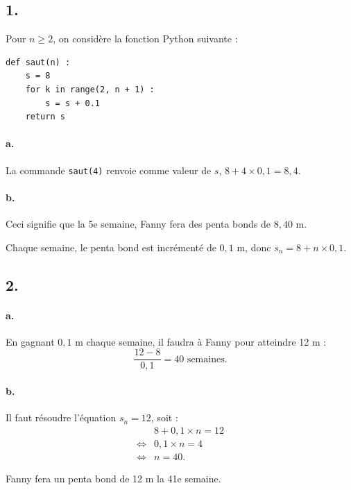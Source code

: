 \subsection*{1.}

Pour \(n \geqslant 2\), on considère la fonction Python suivante :

\begin{center}
\begin{lstlisting}[style=python]
def saut(n) :
    s = 8
    for k in range(2, n + 1) :
        s = s + 0.1
    return s
\end{lstlisting}
\end{center}

\paragraph{a.} La commande \texttt{saut(4)} renvoie comme valeur de \(s\), \(8 + 4 \times 0{,}1 = 8{,}4\).

\paragraph{b.} Ceci signifie que la 5e semaine, Fanny fera des penta bonds de \(8{,}40\) m.

Chaque semaine, le penta bond est incrémenté de \(0{,}1\) m, donc \(s_n = 8 + n \times 0{,}1\).

\subsection*{2.}

\paragraph{a.} En gagnant \(0{,}1\) m chaque semaine, il faudra à Fanny pour atteindre 12 m :
\[
\dfrac{12 - 8}{0{,}1} = 40 \text{ semaines}.
\]

\paragraph{b.} Il faut résoudre l'équation \(s_n = 12\), soit :
\begin{align*}
&8 + 0{,}1 \times n = 12 \\
\iff &0{,}1 \times n = 4 \\
\iff &n = 40.
\end{align*}

Fanny fera un penta bond de 12 m la 41e semaine.
